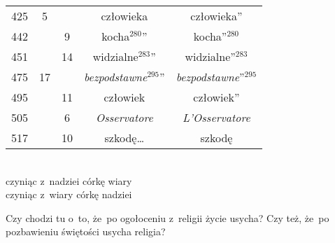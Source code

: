 \documentclass[a4paper,11pt]{article}
\begin{document}
\begin{center}
\begin{tabular}{|c|c|c|c|c|}
    425 & \hphantom{0}5 & & człowieka & człowieka” \\
    442 & & \hphantom{0}9 & kocha$^{ 280 }$” & kocha”$^{ 280 }$ \\
    451 & & 14 & widzialne$^{ 283 }$” & widzialne”$^{ 283 }$ \\
    475 & 17 & & \textit{bezpodstawne}$^{ 295 }$”
           & \textit{bezpodstawne}”$^{ 295 }$ \\
    495 & & 11 & człowiek & człowiek” \\
    505 & & \hphantom{0}6 & \textit{Osservatore} & \textit{L'Osservatore} \\
    517 & & 10 & szkodę\ldots & szkodę \\
    \hline
  \end{tabular}

\end{center}

\vspace{\spaceTwo}


\noindent
{} \\
\Jest  czyniąc z~nadziei córkę wiary \\
\Powin czyniąc z~wiary córkę nadziei \\











\newpage





\noindent
{} Czy chodzi tu o~to, że~po ogołoceniu z~religii życie
usycha? Czy też, że~po pozbawieniu świętości usycha religia?
\end{document}
